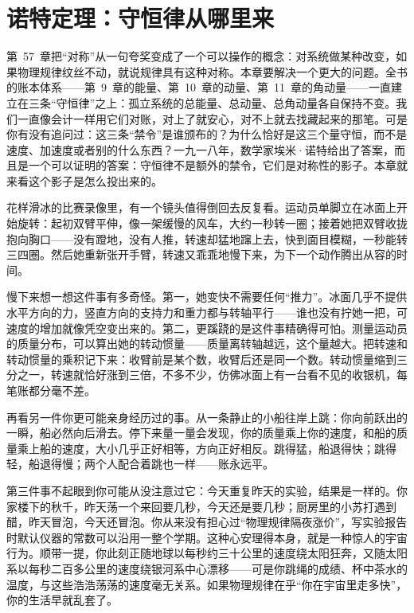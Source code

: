 \chapter{诺特定理：守恒律从哪里来}

第~57~章把“对称”从一句夸奖变成了一个可以操作的概念：对系统做某种改变，如果物理规律纹丝不动，就说规律具有这种对称。本章要解决一个更大的问题。全书的账本体系——第~9~章的能量、第~10~章的动量、第~11~章的角动量——一直建立在三条“守恒律”之上：孤立系统的总能量、总动量、总角动量各自保持不变。我们一直像会计一样用它们对账，对上了就安心，对不上就去找藏起来的那笔。可是你有没有追问过：这三条“禁令”是谁颁布的？为什么恰好是这三个量守恒，而不是速度、加速度或者别的什么东西？一九一八年，数学家埃米·诺特给出了答案，而且是一个可以证明的答案：守恒律不是额外的禁令，它们是对称性的影子。本章就来看这个影子是怎么投出来的。


花样滑冰的比赛录像里，有一个镜头值得倒回去反复看。运动员单脚立在冰面上开始旋转：起初双臂平伸，像一架缓慢的风车，大约一秒转一圈；接着她把双臂收拢抱向胸口——没有蹬地，没有人推，转速却猛地蹿上去，快到面目模糊，一秒能转三四圈。然后她重新张开手臂，转速又乖乖地慢下来，为下一个动作腾出从容的时间。

慢下来想一想这件事有多奇怪。第一，她变快不需要任何“推力”。冰面几乎不提供水平方向的力，竖直方向的支持力和重力都与转轴平行——谁也没有拧她一把，可速度的增加就像凭空变出来的。第二，更蹊跷的是这件事精确得可怕。测量运动员的质量分布，可以算出她的转动惯量——质量离转轴越远，这个量越大。把转速和转动惯量的乘积记下来：收臂前是某个数，收臂后还是同一个数。转动惯量缩到三分之一，转速就恰好涨到三倍，不多不少，仿佛冰面上有一台看不见的收银机，每笔账都分毫不差。

再看另一件你更可能亲身经历过的事。从一条静止的小船往岸上跳：你向前跃出的一瞬，船必然向后滑去。停下来量一量会发现，你的质量乘上你的速度，和船的质量乘上船的速度，大小几乎正好相等，方向正好相反。跳得猛，船退得快；跳得轻，船退得慢；两个人配合着跳也一样——账永远平。

第三件事不起眼到你可能从没注意过它：今天重复昨天的实验，结果是一样的。你家楼下的秋千，昨天荡一个来回要几秒，今天还是要几秒；厨房里的小苏打遇到醋，昨天冒泡，今天还冒泡。你从来没有担心过“物理规律隔夜涨价”，写实验报告时默认仪器的常数可以沿用一整个学期。这种心安理得本身，就是一种惊人的宇宙行为。顺带一提，你此刻正随地球以每秒约三十公里的速度绕太阳狂奔，又随太阳系以每秒二百多公里的速度绕银河系中心漂移——可是你跳绳的成绩、杯中茶水的温度，与这些浩浩荡荡的速度毫无关系。如果物理规律在乎“你在宇宙里走多快”，你的生活早就乱套了。

